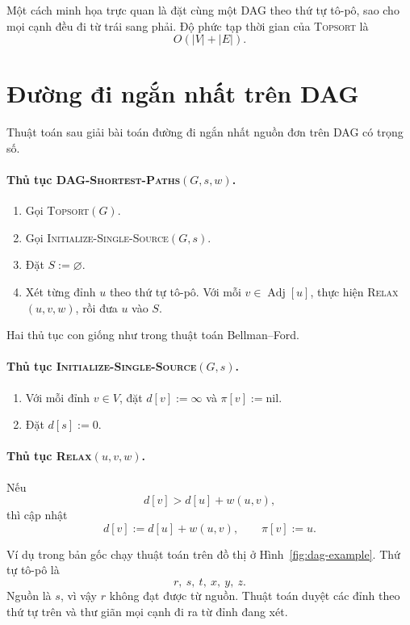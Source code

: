 \documentclass[11pt]{article}
\begin{document}
Một cách minh họa trực quan là đặt cùng một DAG theo thứ tự tô-pô, sao cho mọi
cạnh đều đi từ trái sang phải. Độ phức tạp thời gian của \textsc{Topsort} là
\[
  O(|V|+|E|).
\]

\section{Đường đi ngắn nhất trên DAG}

Thuật toán sau giải bài toán đường đi ngắn nhất nguồn đơn trên DAG có trọng
số.

\paragraph{Thủ tục \textsc{DAG-Shortest-Paths}$(G,s,w)$.}
\begin{enumerate}
  \item Gọi \textsc{Topsort}$(G)$.
  \item Gọi \textsc{Initialize-Single-Source}$(G,s)$.
  \item Đặt $S:=\varnothing$.
  \item Xét từng đỉnh $u$ theo thứ tự tô-pô. Với mỗi $v\in\operatorname{Adj}[u]$,
  thực hiện \textsc{Relax}$(u,v,w)$, rồi đưa $u$ vào $S$.
\end{enumerate}

Hai thủ tục con giống như trong thuật toán Bellman--Ford.

\paragraph{Thủ tục \textsc{Initialize-Single-Source}$(G,s)$.}
\begin{enumerate}
  \item Với mỗi đỉnh $v\in V$, đặt $d[v]:=\infty$ và $\pi[v]:=\mathrm{nil}$.
  \item Đặt $d[s]:=0$.
\end{enumerate}

\paragraph{Thủ tục \textsc{Relax}$(u,v,w)$.}
Nếu
\[
  d[v]>d[u]+w(u,v),
\]
thì cập nhật
\[
  d[v]:=d[u]+w(u,v),\qquad \pi[v]:=u.
\]

Ví dụ trong bản gốc chạy thuật toán trên đồ thị ở Hình~\ref{fig:dag-example}.
Thứ tự tô-pô là
\[
  r,\ s,\ t,\ x,\ y,\ z.
\]
Nguồn là \(s\), vì vậy \(r\) không đạt được từ nguồn. Thuật toán duyệt các đỉnh
theo thứ tự trên và thư giãn mọi cạnh đi ra từ đỉnh đang xét.
\end{document}
